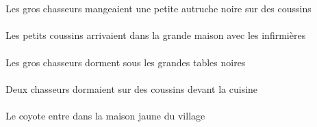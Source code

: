 \begin{exe}
\ex\gll
\INDPlObl{}   \coussinAPlObl{}   \SUR{}   \DEFPlErg{}   \grosCPl{}   \chasseurCPlErg{}   \INDSgAbs{}   \petitDSg{}   \noirDSg{}   \autrucheDSgAbs{}  \mangerVtPstDSg{}\\
\INDPlOblP{}   \coussinAPlOblP{}   \SURP{}   \DEFPlErgP{}   \grosCPlP{}   \chasseurCPlErgP{}   \INDSgAbsP{}   \petitDSgP{}   \noirDSgP{}   \autrucheDSgAbsP{}  \mangerVtPstDSgP{}\\
Les gros chasseurs mangeaient une petite autruche noire sur des coussins
\ex\gll
\DEFPlObl{}   \infirmiereBPlObl{}   \AVEC{}   \DEFPlAbs{}   \petitAPl{}   \coussinAPlAbs{}    \DEFSgObl{}   \grandDSg{}   \maisonDSgObl{}   \DANS{}  \arriverViPstAPl{}\\
\DEFPlOblP{}   \infirmiereBPlOblP{}   \AVECP{}   \DEFPlAbsP{}   \petitAPlP{}   \coussinAPlAbsP{}    \DEFSgOblP{}   \grandDSgP{}   \maisonDSgOblP{}   \DANSP{}  \arriverViPstAPlP{}\\
Les petits coussins arrivaient dans la grande maison avec les infirmières
\ex\gll
\DEFPlAbs{}   \grosCPl{}   \chasseurCPlAbs{}    \DEFPlObl{}   \grandCPl{}   \noirCPl{}   \tableCPlObl{}   \SOUS{}  \dormirViPrsCPl{}\\
\DEFPlAbsP{}   \grosCPlP{}   \chasseurCPlAbsP{}    \DEFPlOblP{}   \grandCPlP{}   \noirCPlP{}   \tableCPlOblP{}   \SOUSP{}  \dormirViPrsCPlP{}\\
Les gros chasseurs dorment sous les grandes tables noires
\ex\gll
\DEFSgObl{}   \cuisineCSgObl{}   \DEVANT{}   \INDDuAbs{}   \chasseurCDuAbs{}    \INDPlObl{}   \coussinAPlObl{}   \SUR{}  \dormirViPstCDu{}\\
\DEFSgOblP{}   \cuisineCSgOblP{}   \DEVANTP{}   \INDDuAbsP{}   \chasseurCDuAbsP{}    \INDPlOblP{}   \coussinAPlOblP{}   \SURP{}  \dormirViPstCDuP{}\\
Deux chasseurs dormaient sur des coussins devant la cuisine
\ex\gll
\DEFSgAbs{}   \coyoteASgAbs{}    \DEFSgObl{}    \DEFSgObl{}   \villageASgObl{}   \DE{}   \jauneDSg{}   \maisonDSgObl{}   \DANS{}  \entrerViPrsASg{}\\
\DEFSgAbsP{}   \coyoteASgAbsP{}    \DEFSgOblP{}    \DEFSgOblP{}   \villageASgOblP{}   \DEP{}   \jauneDSgP{}   \maisonDSgOblP{}   \DANSP{}  \entrerViPrsASgP{}\\
Le coyote entre dans la maison jaune du village
\ex\gll
\DEFPlErg{}   \chasseurCPlErg{}    \DEFPlDat{}   \grandDPl{}   \autrucheDPlDat{}   \INDPlAbs{}   \jauneBPl{}   \fruitBPlAbs{}  \donnerVdPstBPl{}\\
\DEFPlErgP{}   \chasseurCPlErgP{}    \DEFPlDatP{}   \grandDPlP{}   \autrucheDPlDatP{}   \INDPlAbsP{}   \jauneBPlP{}   \fruitBPlAbsP{}  \donnerVdPstBPlP{}\\

\end{exe}
